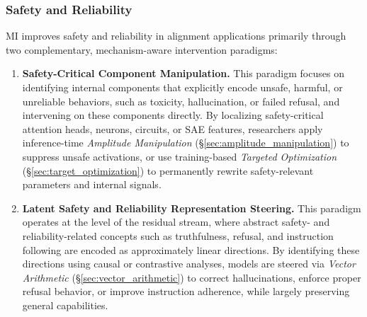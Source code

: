 \documentclass[11pt,letterpaper]{mystyle}
\begin{document}
\subsubsection{Safety and Reliability}
\label{sec:safety_reliabilty}
\begin{tcolorbox}[takeawaysbox, title={Summary of Application Paradigms}]
  MI improves safety and reliability in alignment applications primarily through two complementary, mechanism-aware intervention paradigms:
  
  \begin{enumerate}[leftmargin=*, label=\arabic*)]
  \item \textbf{Safety-Critical Component Manipulation.}  
  This paradigm focuses on identifying internal components that explicitly encode unsafe, harmful, or unreliable behaviors, such as toxicity, hallucination, or failed refusal, and intervening on these components directly. By localizing safety-critical attention heads, neurons, circuits, or SAE features, researchers apply inference-time \textit{Amplitude Manipulation} (\S\ref{sec:amplitude_manipulation}) to suppress unsafe activations, or use training-based \textit{Targeted Optimization} (\S\ref{sec:target_optimization}) to permanently rewrite safety-relevant parameters and internal signals.
  \item \textbf{Latent Safety and Reliability Representation Steering.}  
  This paradigm operates at the level of the residual stream, where abstract safety- and reliability-related concepts such as truthfulness, refusal, and instruction following are encoded as approximately linear directions. By identifying these directions using causal or contrastive analyses, models are steered via \textit{Vector Arithmetic} (\S\ref{sec:vector_arithmetic}) to correct hallucinations, enforce proper refusal behavior, or improve instruction adherence, while largely preserving general capabilities.
  \end{enumerate}
  \end{tcolorbox}
\end{document}
